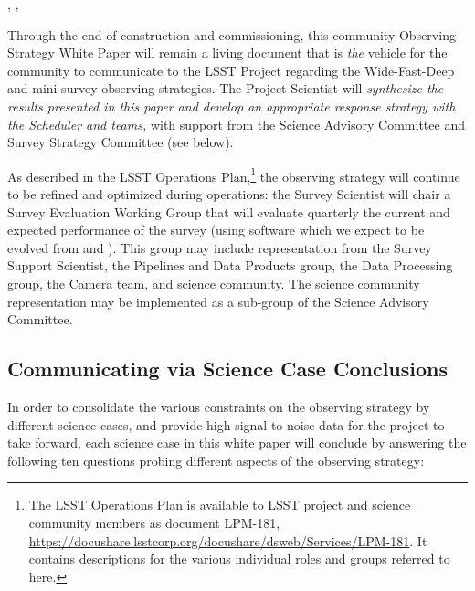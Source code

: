 , , 

Through the end of construction and commissioning, this community
Observing Strategy White Paper will remain a living document that is
{\it the} vehicle for the community to communicate to the LSST Project
regarding the Wide-Fast-Deep and mini-survey observing strategies.
The Project Scientist will {\it synthesize the results presented in this paper
and develop an appropriate response strategy with the Scheduler and \OpSim
teams,} with support from the Science Advisory Committee and Survey Strategy Committee (see below).

As described in the LSST Operations Plan,\footnote{The LSST Operations Plan is available to LSST project and science community members as document LPM-181, \url{https://docushare.lsstcorp.org/docushare/dsweb/Services/LPM-181}. It contains descriptions for the various individual roles and groups referred to here.} the observing
strategy will continue to be refined and optimized during operations:
the Survey Scientist will chair a Survey Evaluation Working Group that
will evaluate quarterly the current and expected performance of the
survey (using software which we expect to be evolved from \OpSim and \MAF).
This group may include representation
from the Survey Support Scientist, the Pipelines and Data Products
group, the Data Processing group, the Camera team, and science
community.  The science community representation may be implemented as a
sub-group of the Science Advisory Committee.


\subsection{Communicating via Science Case Conclusions}
\def\secname{intro:evaluation:caseConclusions}\label{sec:\secname}


In order to consolidate the various constraints on the observing
strategy by different science cases, and provide high signal to noise
data for the project to take forward, each science case in this white paper will conclude by answering the following ten
questions probing different aspects of the observing strategy:

